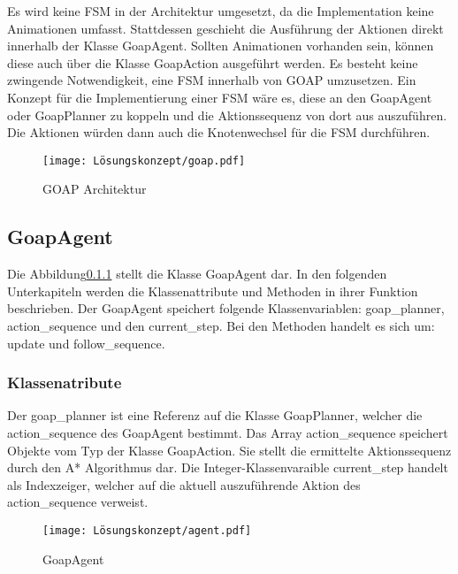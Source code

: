 Es wird keine FSM in der Architektur umgesetzt, da die Implementation keine Animationen umfasst. Stattdessen geschieht die Ausführung der Aktionen direkt innerhalb der Klasse GoapAgent. Sollten Animationen vorhanden sein, können diese auch über die Klasse GoapAction ausgeführt werden. Es besteht keine zwingende Notwendigkeit, eine FSM innerhalb von GOAP umzusetzen. Ein Konzept für die Implementierung einer FSM wäre es, diese an den GoapAgent oder GoapPlanner zu koppeln und die Aktionssequenz von dort aus auszuführen. Die Aktionen würden dann auch die Knotenwechsel für die FSM durchführen.

\begin{figure}[h]
  \centering
  \texttt{[image: Lösungskonzept/goap.pdf]}
	\captionsetup{justification=justified, format=plain}
  \caption{GOAP Architektur}
  \label{fig:GOAP Architektur}
\end{figure}

\subsection{GoapAgent}

Die Abbildung\ref{} stellt die Klasse GoapAgent dar. In den folgenden Unterkapiteln werden die Klassenattribute und Methoden in ihrer Funktion beschrieben. Der GoapAgent speichert folgende Klassenvariablen: goap\_planner, action\_sequence und den current\_step. Bei den Methoden handelt es sich um: update und follow\_sequence.

\subsubsection{Klassenatribute}

Der goap\_planner ist eine Referenz auf die Klasse GoapPlanner, welcher die action\_sequence des GoapAgent bestimmt. Das Array action\_sequence speichert Objekte vom Typ der Klasse GoapAction. Sie stellt die ermittelte Aktionssequenz durch den A* Algorithmus dar. Die Integer-Klassenvaraible current\_step handelt als Indexzeiger, welcher auf die aktuell auszuführende Aktion des action\_sequence verweist.

\begin{figure}[h]
  \centering
  \texttt{[image: Lösungskonzept/agent.pdf]}
	\captionsetup{justification=justified, format=plain}
  \caption{GoapAgent}
  \label{fig:GoapAgent}
\end{figure}

